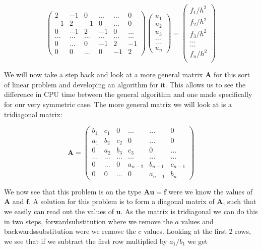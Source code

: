 \documentclass[a4paper,11pt]{article}
\begin{document}
{\begin{equation}
\begin{pmatrix}
2 & -1 & 0 & ... & ... & 0 \\
-1 & 2 & -1 & 0 & ... & 0 \\
0 & -1 & 2 & -1 & 0 & ... \\
... & ... & ... & ... & ... & ... \\
0 & ... & 0 & -1 & 2 & -1 \\
0 & 0 & ... & 0 & -1 & 2 
\end{pmatrix} \begin{pmatrix}
u_1\\
u_2\\
u_3\\
...\\
...\\
u_n
\end{pmatrix} = \begin{pmatrix}
f_1/h^2 \\
f_2/h^2 \\
f_3/h^2 \\
... \\
... \\
f_n/h^2 \\
\end{pmatrix}
\end{equation}

We will now take a step back and look at a more general matrix $\mathbf{A}$ for this sort of linear problem and developing an algorithm for it. This allows us to see the difference in CPU time between the general algorithm and one made specifically for our very symmetric case. The more general matrix we will look at is a tridiagonal matrix:

\begin{equation}
\mathbf{A} = \begin{pmatrix}
b_1 & c_1 & 0 & ... & ... & 0 \\
a_1 & b_2 & c_2 & 0 & ... & 0 \\
0 & a_2 & b_3 & c_3 & 0 & ... \\
... & ... & ... & ... & ... & ... \\
0 & ... & 0 & a_{n-2} & b_{n-1} & c_{n-1} \\
0 & 0 & ... & 0 & a_{n-1} & b_{n} 
\end{pmatrix}
\label{general_tridiagonal_matrix}
\end{equation}

We now see that this problem is on the type $\mathbf{A}\mathbf{u}=\mathbf{f}$ were we know the values of $\mathbf{A}$ and $\mathbf{f}$. A solution for this problem is to form a diagonal matrix of $\mathbf{A}$, such that we easily can read out the values of $\mathbf{u}$. As the matrix is tridiagonal we can do this in two steps, forwardsubstitution where we remove the $a$ values and backwardssubstitution were we remove the $c$ values. Looking at the first 2 rows, we see that if we subtract the first row multiplied by $a_1/b_1$ we get

}
\end{document}

